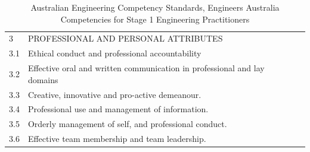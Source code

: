 \documentclass[11pt]{article}
\newenvironment{localsize}[1]
{%
  \clearpage
  \let\orignewcommand\newcommand
  \let\newcommand\renewcommand
  \makeatletter
  \makeatother
  \let\newcommand\orignewcommand
}
{%
  \clearpage
}
\begin{document}
\begin{localsize}{10}
\begin{table}
\begin{tabular}{|p{0.75cm} | p{8cm} | p{1.5cm} | p{2.5cm} | p{2.5cm}|}
   & & & & \\ \hline
   3 & PROFESSIONAL AND PERSONAL ATTRIBUTES & & & \\ \hline
   3.1 & Ethical conduct and professional accountability & & & \\ \hline
   3.2 & Effective oral and written communication in professional and lay domains & & & \\ \hline
   3.3 & Creative, innovative and pro-active demeanour. & & & \\ \hline
   3.4 & Professional use and management of information. & & & \\ \hline
   3.5 & Orderly management of self, and professional conduct. & & & \\ \hline
   3.6 & Effective team membership and team leadership. & & & \\ \hline
   \end{tabular}
\caption{Australian Engineering Competency Standards, Engineers Australia
Competencies for Stage 1 Engineering Practitioners}
\end{table}

\end{localsize}
\end{document}
